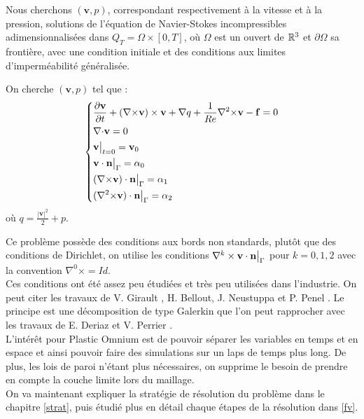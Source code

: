 Nous cherchons $(\mathbf{v},p)$, correspondant respectivement à la vitesse et à la pression, solutions de l'équation de Navier-Stokes incompressibles adimensionnalisées dans $Q_T=\Omega\times[0,T]$, où $\Omega$ est un ouvert de ${\mathbb{R}}^3$ et $\partial\Omega$ sa frontière, avec une condition initiale et des conditions aux limites d'imperméabilité généralisée.
\begin{pb}\label{depart}
On cherche $(\mathbf{v},p)$ tel que :
\begin{equation*}
\left\{\begin{aligned}
&\frac{\partial \mathbf{v}}{\partial t} + ({\nabla\times}  \mathbf{v})\times \mathbf{v} + {\nabla} q + \frac{1}{Re}{\nabla^2\times}  \mathbf{v}-\mathbf{f} = 0\\
&{\nabla\cdot} \mathbf{v} = 0\\
&\mathbf{v}\big\rvert_{t=0} = \mathbf{v}_0\\
&\mathbf{v}\cdot \mathbf{n}{\big\rvert_{\Gamma}} = \alpha_0\\
&({\nabla\times}  \mathbf{v})\cdot \mathbf{n}{\big\rvert_{\Gamma}} = \alpha_1\\
&({\nabla^2\times}  \mathbf{v})\cdot \mathbf{n}{\big\rvert_{\Gamma}} = \alpha_2
\end{aligned}\right.
\end{equation*}
où $q = \frac{|\mathbf{v}|^2}{2}+p$.\\
\end{pb}
Ce problème possède des conditions aux bords non standards, plutôt que des conditions de Dirichlet, on utilise les conditions $\nabla^k\times\mathbf{v}\cdot\mathbf{n}{\big\rvert_{\Gamma}}$ pour $k=0,1,2$ avec la convention $\nabla^0\times=Id$.\\
Ces conditions ont été assez peu étudiées et très peu utilisées dans l'industrie. On peut citer les travaux de V. Girault \cite{girault90-1}, H. Bellout, J. Neustuppa et P. Penel \cite{Penel2004}. Le principe est une décomposition de type Galerkin que l'on peut rapprocher avec les travaux de E. Deriaz et V. Perrier \cite{Deriaz2009249}.\\

L'intérêt pour Plastic Omnium est de pouvoir séparer les variables en temps et en espace et ainsi pouvoir faire des simulations sur un laps de temps plus long. De plus, les lois de paroi n'étant plus nécessaires, on supprime le besoin de prendre en compte la couche limite lors du maillage.\\

On va maintenant expliquer la stratégie de résolution du problème dans le chapitre \ref{strat}, puis étudié plus en détail chaque étapes de la résolution dans \ref{fv}.

